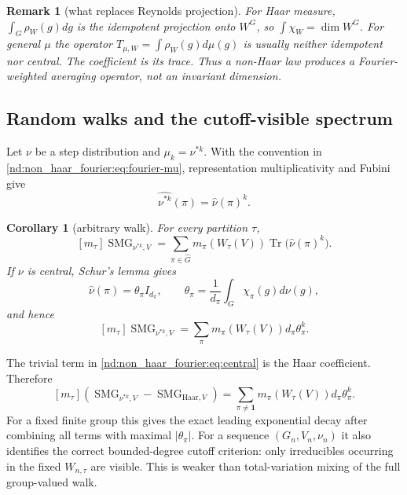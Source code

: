 \documentclass[10pt]{article}
\newcommand{\Tr}{\operatorname{Tr}}
\newcommand{\SMG}{\operatorname{SMG}}
\newcommand{\MGF}{\SMG}
\newcommand{\one}{\mathbf 1}
\newtheorem{corollary}{Corollary}
\newtheorem{remark}{Remark}
\begin{document}
\begin{remark}[what replaces Reynolds projection]
For Haar measure,
$\int_G\rho_W(g)dg$ is the idempotent projection onto $W^G$, so
$\int\chi_W=\dim W^G$.  For general $\mu$ the operator
$T_{\mu,W}=\int\rho_W(g)d\mu(g)$ is usually neither idempotent nor central.
The coefficient is its trace.  Thus a non-Haar law produces a
Fourier-weighted averaging operator, not an invariant dimension.
\end{remark}

\subsection{Random walks and the cutoff-visible spectrum}

Let $\nu$ be a step distribution and $\mu_k=\nu^{*k}$.  With the convention
in \eqref{nd:non_haar_fourier:eq:fourier-mu}, representation multiplicativity and Fubini give
\begin{equation}\label{nd:non_haar_fourier:eq:conv}
 \widehat{\nu^{*k}}(\pi)=\widehat\nu(\pi)^k.
\end{equation}

\begin{corollary}[arbitrary walk]\label{nd:non_haar_fourier:cor:walk}
For every partition $\tau$,
\begin{equation}\label{nd:non_haar_fourier:eq:walk}
 \boxed{[m_\tau]\MGF_{\nu^{*k},V}
 =\sum_{\pi\in\widehat G}m_\pi(W_\tau(V))
       \Tr\bigl(\widehat\nu(\pi)^k\bigr).}
\end{equation}
If $\nu$ is central, Schur's lemma gives
\begin{equation}\label{nd:non_haar_fourier:eq:theta}
 \widehat\nu(\pi)=\theta_\pi I_{d_\pi},\qquad
 \theta_\pi=\frac1{d_\pi}\int_G\chi_\pi(g)d\nu(g),
\end{equation}
and hence
\begin{equation}\label{nd:non_haar_fourier:eq:central}
 \boxed{[m_\tau]\MGF_{\nu^{*k},V}
 =\sum_\pi m_\pi(W_\tau(V))d_\pi\theta_\pi^k.}
\end{equation}
\end{corollary}

The trivial term in \eqref{nd:non_haar_fourier:eq:central} is the Haar coefficient.  Therefore
\begin{equation}\label{nd:non_haar_fourier:eq:deviation}
 [m_\tau](\MGF_{\nu^{*k},V}-\MGF_{\mathrm{Haar},V})
 =\sum_{\pi\ne\one}m_\pi(W_\tau(V))d_\pi\theta_\pi^k.
\end{equation}
For a fixed finite group this gives the exact leading exponential decay after
combining all terms with maximal $|\theta_\pi|$.  For a sequence
$(G_n,V_n,\nu_n)$ it also identifies the correct bounded-degree cutoff
criterion: only irreducibles occurring in the fixed $W_{n,\tau}$ are visible.
This is weaker than total-variation mixing of the full group-valued walk.
\end{document}
